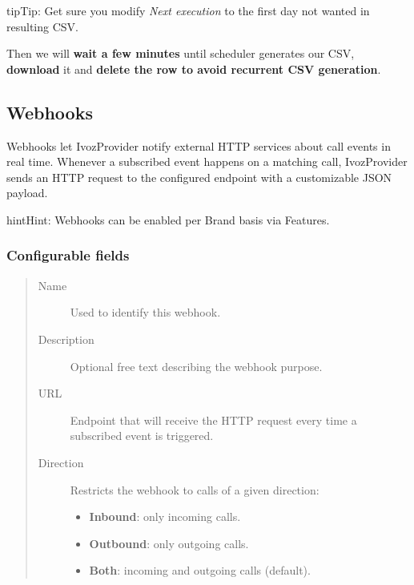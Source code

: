 \documentclass[letterpaper,10pt,english]{sphinxmanual}
\begin{document}
\begin{notice}{tip}{Tip:}
Get sure you modify \emph{Next execution} to the first day not wanted in resulting CSV.
\end{notice}

Then we will \textbf{wait a few minutes} until scheduler generates our CSV, \textbf{download} it and \textbf{delete the row to avoid recurrent
CSV generation}.


\subsection{Webhooks}
\label{administration_portal/brand/calls/webhooks:brand-webhooks}\label{administration_portal/brand/calls/webhooks:webhooks}\label{administration_portal/brand/calls/webhooks::doc}
Webhooks let IvozProvider notify external HTTP services about call events in real time. Whenever a
subscribed event happens on a matching call, IvozProvider sends an HTTP  request to the
configured endpoint with a customizable JSON payload.

\begin{notice}{hint}{Hint:}
Webhooks can be enabled per Brand basis via Features.
\end{notice}


\subsubsection{Configurable fields}
\label{administration_portal/brand/calls/webhooks:configurable-fields}\begin{quote}
\begin{description}
\item[{Name}] \leavevmode
Used to identify this webhook.

\item[{Description}] \leavevmode
Optional free text describing the webhook purpose.

\item[{URL}] \leavevmode
Endpoint that will receive the HTTP  request every time a subscribed event is triggered.

\item[{Direction}] \leavevmode
Restricts the webhook to calls of a given direction:
\begin{itemize}
\item {} 
\textbf{Inbound}: only incoming calls.

\item {} 
\textbf{Outbound}: only outgoing calls.

\item {} 
\textbf{Both}: incoming and outgoing calls (default).

\end{itemize}

\end{description}
\end{quote}
\end{document}
